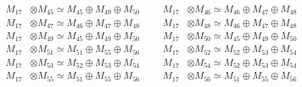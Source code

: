 \begin{align*}
M_{17} &\otimes M_{45} \simeq M_{45} \oplus M_{49} \oplus M_{50} &&& M_{17} &\otimes M_{46} \simeq M_{46} \oplus M_{47} \oplus M_{48}\\
M_{17} &\otimes M_{47} \simeq M_{46} \oplus M_{47} \oplus M_{48} &&& M_{17} &\otimes M_{48} \simeq M_{46} \oplus M_{47} \oplus M_{48}\\
M_{17} &\otimes M_{49} \simeq M_{45} \oplus M_{49} \oplus M_{50} &&& M_{17} &\otimes M_{50} \simeq M_{45} \oplus M_{49} \oplus M_{50}\\
M_{17} &\otimes M_{51} \simeq M_{51} \oplus M_{55} \oplus M_{56} &&& M_{17} &\otimes M_{52} \simeq M_{52} \oplus M_{53} \oplus M_{54}\\
M_{17} &\otimes M_{53} \simeq M_{52} \oplus M_{53} \oplus M_{54} &&& M_{17} &\otimes M_{54} \simeq M_{52} \oplus M_{53} \oplus M_{54}\\
M_{17} &\otimes M_{55} \simeq M_{51} \oplus M_{55} \oplus M_{56} &&& M_{17} &\otimes M_{56} \simeq M_{51} \oplus M_{55} \oplus M_{56}\\
\end{align*}


